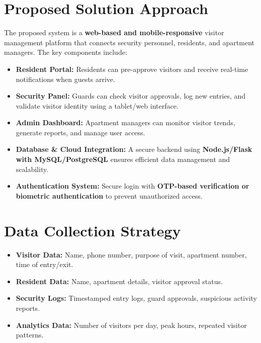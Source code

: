 \documentclass[sigconf]{acmart}
\begin{document}
\section{Proposed Solution Approach}
The proposed system is a \textbf{web-based and mobile-responsive} visitor management platform that connects security personnel, residents, and apartment managers. The key components include:
\begin{itemize}
    \item \textbf{Resident Portal:} Residents can pre-approve visitors and receive real-time notifications when guests arrive.
    \item \textbf{Security Panel:} Guards can check visitor approvals, log new entries, and validate visitor identity using a tablet/web interface.
    \item \textbf{Admin Dashboard:} Apartment managers can monitor visitor trends, generate reports, and manage user access.
    \item \textbf{Database \& Cloud Integration:} A secure backend using \textbf{Node.js/Flask with MySQL/PostgreSQL} ensures efficient data management and scalability.
    \item \textbf{Authentication System:} Secure login with \textbf{OTP-based verification or biometric authentication} to prevent unauthorized access.
\end{itemize}

\section{Data Collection Strategy}
\begin{itemize}
    \item \textbf{Visitor Data:} Name, phone number, purpose of visit, apartment number, time of entry/exit.
    \item \textbf{Resident Data:} Name, apartment details, visitor approval status.
    \item \textbf{Security Logs:} Timestamped entry logs, guard approvals, suspicious activity reports.
    \item \textbf{Analytics Data:} Number of visitors per day, peak hours, repeated visitor patterns.
\end{itemize}
\end{document}
